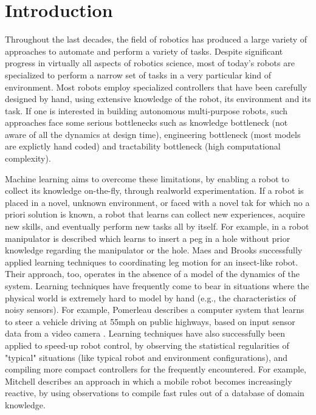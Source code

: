 \documentclass[conference]{IEEEtran}
\begin{document}
\section{Introduction}
Throughout the last decades, the field of robotics has produced a large variety of approaches to automate and perform a variety of tasks. Despite significant progress in virtually all aspects of robotics science, most of today's robots are specialized to perform a narrow set of tasks in a very particular kind of environment. Most robots employ specialized controllers that have been carefully designed by hand, using extensive knowledge of the robot, its environment and its task. If one is interested in building autonomous multi-purpose robots, such approaches face some serious bottlenecks such as knowledge bottleneck (not aware of all the dynamics at design time), engineering bottleneck (most models are explictly hand coded) and tractability bottleneck (high computational complexity). 

Machine learning aims to overcome these limitations, by enabling a robot to collect its knowledge on-the-fly, through realworld experimentation. If a robot is placed in a novel, unknown environment, or faced with a novel tak for which no a priori solution is known, a robot that learns can collect new experiences, acquire new skills, and eventually perform new tasks all by itself. For example, in \cite{ref:1} a robot manipulator is described which learns to insert a peg in a hole without prior knowledge regarding the manipulator or the hole. Maes and Brooks \cite{ref:2} successfully applied learning techniques to coordinating leg motion for an insect-like robot. Their approach, too, operates in the absence of a model of the dynamics of the system. Learning techniques have frequently come to bear in situations where the physical world is extremely hard to model by hand (e.g., the characteristics of noisy sensors). For example, Pomerleau describes a computer system that learns to steer a vehicle driving at 55mph on public highways, based on input sensor data from a video camera \cite{ref:3}. Learning techniques have also successfully been applied to speed-up robot control, by observing the statistical regularities of "typical" situations (like typical robot and environment configurations), and compiling more compact controllers for the frequently encountered. For example, Mitchell \cite{ref:4} describes an approach in which a mobile robot becomes increasingly reactive, by using observations to compile fast rules out of a database of domain knowledge. 
\end{document}
